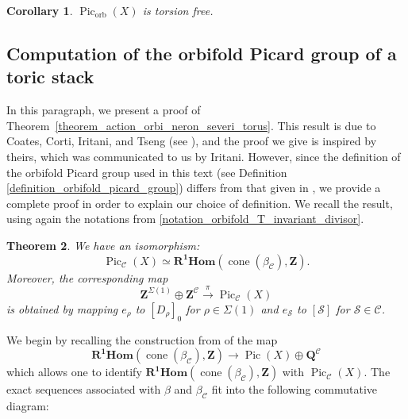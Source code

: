 \documentclass{proc-l}
\newcommand{\Z}{\mathbf{Z}}
\newcommand{\Q}{\mathbf{Q}}
\DeclareMathOperator{\Pic}{Pic}
\DeclareMathOperator{\coneform}{cone}
\DeclareMathOperator{\orb}{orb}
\newcommand{\stackS}{\mathcal{S}}
\newtheorem{theorem}{Theorem}[section]
\newtheorem{cor}[theorem]{Corollary}
\theoremstyle{definition}
\theoremstyle{remark}
\numberwithin{equation}{section}
\begin{document}
\begin{cor}\label{corollaire_orbifold_picard_group_torsion_free}
    $\Pic_{\orb}(X)$ is torsion free.
\end{cor}

\subsection{Computation of the orbifold Picard group of a toric stack}



In this paragraph, we present a proof of Theorem~\ref{theorem_action_orbi_neron_severi_torus}. This result is due to Coates, Corti, Iritani, and Tseng (see \cite[Proposition 21]{Coates_Corti_Iritani_Tseng_miror_theorem_toric_stack}), and the proof we give is inspired by theirs, which was communicated to us by Iritani. However, since the definition of the orbifold Picard group used in this text (see Definition \ref{definition_orbifold_picard_group}) differs from that given in \cite[Definition 15]{Coates_Corti_Iritani_Tseng_miror_theorem_toric_stack}, we provide a complete proof in order to explain our choice of definition. We recall the result, using again the notations from \ref{notation_orbifold_T_invariant_divisor}.

\begin{theorem}\label{theorem_computation_orbifold_picard_group_toric_stack_appendix}
    We have an isomorphism:
    $$ \Pic_{\mathcal{C}}(X) \simeq \mathbf{R^1 Hom}(\coneform(\beta_{\mathcal{C}}),\Z).$$Moreover, the corresponding map $$ \Z^{\Sigma(1)} \oplus \Z^{\mathcal{C} } \xrightarrow{\pi} \Pic_{\mathcal{C}}(X)$$is obtained by mapping $e_{\rho}$ to $[D_{\rho}]_{0}$ for $\rho \in \Sigma(1)$ and $e_{\stackS}$ to $[\stackS]$ for $\stackS \in \mathcal{C}$.
\end{theorem}

We begin by recalling the construction from \cite{Coates_Corti_Iritani_Tseng_miror_theorem_toric_stack}  of the map
$$\mathbf{R^1 Hom}(\coneform(\beta_{\mathcal{C}}),\Z) \rightarrow \Pic(X) \oplus \Q^{\mathcal{C}}$$
which allows one to identify $\mathbf{R^1 Hom}(\coneform(\beta_{\mathcal{C}}),\Z)$ with $\Pic_{\mathcal C}(X)$. The exact sequences associated with $\beta$ and $\beta_{\mathcal{C}}$ fit into the following commutative diagram:
\end{document}
